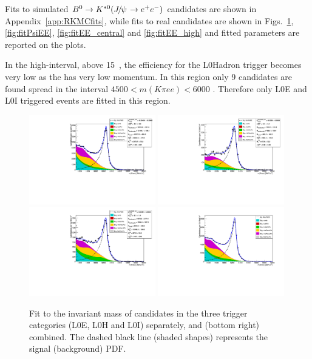 Fits to simulated $\Bz\to\Kstarz(\jpsi\to\epem)$ candidates are shown in Appendix~\ref{app:RKMCfits}, while
fits to real candidates are shown in Figs.~\ref{fig:fitJPsEE}, \ref{fig:fitPsiEE}, \ref{fig:fitEE_central}
and \ref{fig:fitEE_high} and fitted parameters are reported on the plots. 

In the high-\qsq interval, above 15~\gevgevcccc, the efficiency for the
L0Hadron trigger becomes very low as the \Kstar has very low momentum.
In this region only 9 candidates are found spread in the interval
$4500 < m(K\pi ee) < 6000$ \mevcc. Therefore
only L0E and L0I triggered events are fitted in this region.
%
\begin{figure}[h!]
\centering
\includegraphics[width=0.49\textwidth]{RKst/figs/Fit/fit_EE/KstJPsEE_L0E.pdf}
\includegraphics[width=0.49\textwidth]{RKst/figs/Fit/fit_EE/KstJPsEE_L0H.pdf}
\includegraphics[width=0.49\textwidth]{RKst/figs/Fit/fit_EE/KstJPsEE_L0I.pdf}
\includegraphics[width=0.49\textwidth]{RKst/figs/Fit/fit_EE/fit_JPs.pdf}
\caption{Fit to the \mKpiee invariant mass of \BdToKstJPsee candidates in the three trigger categories (L0E, L0H and L0I) separately, and (bottom right) combined. The dashed black line (shaded shapes) represents the signal (background) PDF.}
\label{fig:fitJPsEE}
\end{figure}
